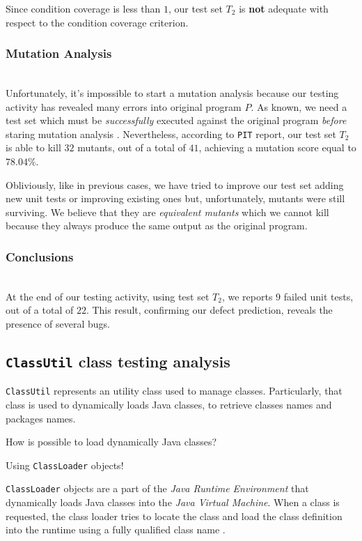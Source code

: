 \documentclass[sigconf]{acmart}
\begin{document}
Since condition coverage is less than $1$, our test set $T_2$ is \textbf{not} adequate with respect to the condition coverage criterion. 

\subsubsection{Mutation Analysis}
\hfill\\

Unfortunately, it's impossible to start a mutation analysis because our testing activity has revealed many errors into original program $P$. As known, we need a test set which must be \textit{successfully} executed against the original program \textit{before} staring mutation analysis \cite{mutation}. Nevertheless, according to \texttt{PIT} report, our test set $T_2$ is able to kill $32$ mutants, out of a total of $41$, achieving a mutation score equal to $78.04 \%$. 

Obliviously, like in previous cases, we have tried to improve our test set adding new unit tests or improving existing ones but, unfortunately, mutants were still surviving. We believe that they are \textit{equivalent mutants} which we cannot kill because they always produce the same output as the original program. 

\subsubsection{Conclusions}
\hfill\\
At the end of our testing activity, using test set $T_2$, we reports $9$ failed unit tests, out of a total of $22$. This result, confirming our defect prediction, reveals the presence of several bugs. 

\subsection{\texttt{ClassUtil} class testing analysis}

\texttt{ClassUtil} represents an utility class used to manage classes. Particularly, that class is used to dynamically loads Java classes, to retrieve classes names and packages names.

How is possible to load dynamically Java classes?

Using \texttt{ClassLoader} objects!

\texttt{ClassLoader} objects are a part of the \textit{Java Runtime Environment} that dynamically loads Java classes into the \textit{Java Virtual Machine}. When a class is requested, the class loader tries to locate the class and load the class definition into the runtime using a fully qualified class name \cite{ClassLoader}. 
\end{document}
